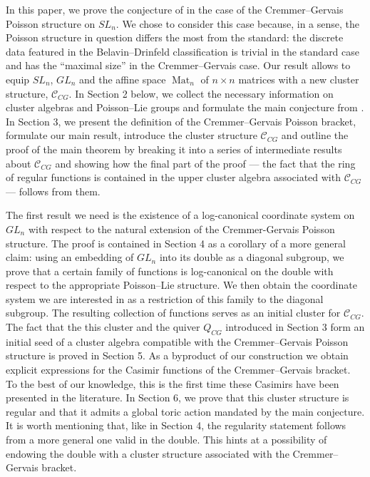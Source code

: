 \documentclass{amsart}
\theoremstyle{definition}
\theoremstyle{remark}
\numberwithin{equation}{section}
\numberwithin{theorem}{section}
\begin{document}
In this paper, we prove the conjecture of \cite{GSVMMJ} in the case of the Cremmer--Gervais Poisson structure on $SL_n$. We chose to consider this case because, in a sense, the Poisson structure in question differs the most from the standard: the discrete data featured in the Belavin--Drinfeld classification is trivial in the standard case and has the ``maximal size'' in the Cremmer--Gervais case. Our result allows to equip $SL_n$, $GL_n$ and the affine space ${\operatorname{Mat}}_n$ of $n\times n$ matrices with a new cluster structure, ${{\mathcal C}}_{CG}$. In Section 2 below, we collect the necessary information on cluster algebras and Poisson--Lie groups and formulate the main conjecture from \cite{GSVMMJ}. In Section 3, we present the definition of the Cremmer--Gervais Poisson bracket, formulate our main result, introduce the cluster structure ${{\mathcal C}}_{CG}$ and outline the proof of the main theorem by breaking it into a series of intermediate results about ${{\mathcal C}}_{CG}$ and showing how the final part of the proof --- the fact that the ring of regular functions is contained in the upper cluster algebra associated with ${{\mathcal C}}_{CG}$ ---
 follows from them. 

The first result we need is the existence of a log-canonical coordinate system on $GL_n$ with respect to the natural extension of the Cremmer-Gervais Poisson structure. The proof is contained in Section 4 as a corollary of a more general claim: using an embedding of $GL_n$ into its double as a diagonal subgroup, we prove that a certain family of functions is log-canonical on the double with respect to the appropriate Poisson--Lie structure. We then obtain the coordinate system we are interested in
 as a restriction  of this family to the diagonal subgroup. The resulting collection of functions serves as an initial cluster for ${{\mathcal C}}_{CG}$. The fact that the  this cluster and the quiver $Q_{CG}$ introduced in Section 3 form an initial seed of a cluster algebra compatible with the Cremmer--Gervais Poisson structure is proved in Section 5. As a byproduct of our construction we obtain explicit expressions for the Casimir functions 
 of the Cremmer--Gervais bracket.
 To the best of our knowledge, this is the first time these Casimirs  have been presented in the literature.
 In Section 6, we prove that this cluster structure is regular and that it admits a global toric action mandated by the main conjecture. It is worth mentioning that, like in Section 4, the regularity statement follows from a more general one valid in the double. This hints at a possibility of endowing the double with a cluster structure associated with the Cremmer--Gervais bracket. 
 
\end{document}
